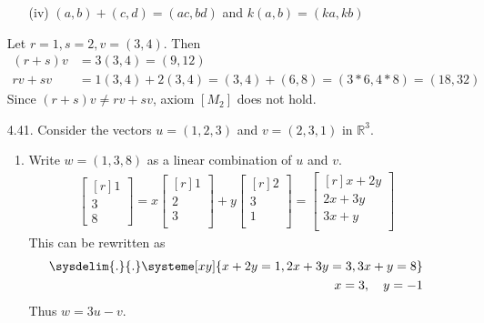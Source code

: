 \documentclass[12pt]{article}
\begin{document}
\begin{enumerate}
\begin{enumerate}
	\item[(iv)] $(a,b)+(c,d)=(ac,bd)$ and $k(a,b)=(ka,kb)$
	\end{enumerate}
		Let $r=1,s=2,v=(3,4)$. Then
		\begin{align*}
		(r+s)v &= 3(3,4) = (9,12)\\
		rv + sv &= 1(3,4) + 2(3,4) = (3,4) + (6,8) = (3*6,4*8) = (18,32)
		\end{align*}
		Since $(r+s)v \neq rv + sv$, axiom $[M_2]$ does not hold.\\
	
\item[4.41.] Consider the vectors $u=(1,2,3)$ and $v=(2,3,1)$ in $\mathbb{R}^3$.
	\begin{enumerate}
	\item Write $w=(1,3,8)$ as a linear combination of $u$ and $v$.\\
		\begin{align*}
		\begin{bmatrix}[r]1\\3\\8 \end{bmatrix} 
		= x \begin{bmatrix}[r] 1\\2\\3\\ \end{bmatrix}
		+ y \begin{bmatrix}[r] 2\\3\\1\\ \end{bmatrix}
		= \begin{bmatrix}[r] x+2y\\ 2x+3y\\ 3x+y\\ \end{bmatrix}
		\end{align*}
		This can be rewritten as
		\begin{align*}
		\sysdelim{.}{.}\systeme[xy]{x+2y=1,2x+3y=3,3x+y=8}\\
		x=3, \quad y=-1
		\end{align*}
		Thus $w=3u-v$.\\


\end{enumerate}
\end{enumerate}
\end{document}
